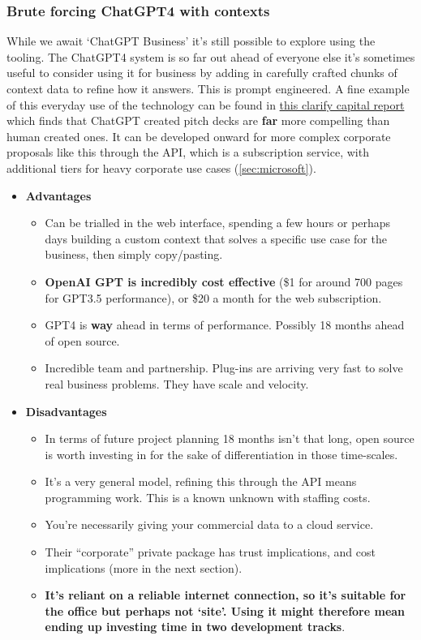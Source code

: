 \subsubsection{Brute forcing ChatGPT4 with contexts}
While we await `ChatGPT Business' it's still possible to explore using the tooling. The ChatGPT4 system is so far out ahead of everyone else it's sometimes useful to consider using it for business by adding in carefully crafted chunks of context data to refine how it answers. This is prompt engineered. A fine example of this everyday use of the technology can be found in \href{https://clarifycapital.com/the-future-of-investment-pitching}{this clarify capital report} which finds that ChatGPT created pitch decks are \textbf{far} more compelling than human created ones. It can be developed onward for more complex corporate proposals like this through the API, which is a subscription service, with additional tiers for heavy corporate use cases (\ref{sec:microsoft}).
\begin{itemize}
\item \textbf{Advantages}
\begin{itemize}
\item Can be trialled in the web interface, spending a few hours or perhaps days building a custom context that solves a specific use case for the business, then simply copy/pasting.
\item \textbf{OpenAI GPT is incredibly cost effective} (\$1 for around 700 pages for GPT3.5 performance), or \$20 a month for the web subscription.
\item GPT4 is \textbf{way} ahead in terms of performance. Possibly 18 months ahead of open source.
\item Incredible team and partnership. Plug-ins are arriving very fast to solve real business problems. They have scale and velocity. 
\end{itemize}
\item \textbf{Disadvantages}
\begin{itemize}
\item In terms of future project planning 18 months isn't that long, open source is worth investing in for the sake of differentiation in those time-scales.
\item It's a very general model, refining this through the API means programming work. This is a known unknown with staffing costs.
\item You're necessarily giving your commercial data to a cloud service.
\item Their ``corporate'' private package has trust implications, and cost implications (more in the next section).
\item \textbf{It's reliant on a reliable internet connection, so it's suitable for the office but perhaps not `site'. Using it might therefore mean ending up investing time in two development tracks}.
\end{itemize}
\end{itemize}
